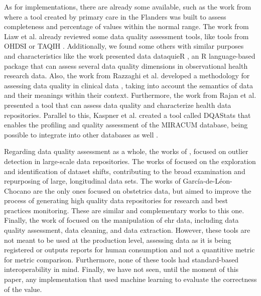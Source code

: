 As for implementations, there are already some available, such as the work from \cite{phanAutomatedDataCleaning2020} where a tool created by primary care in the Flanders was built to assess completeness and percentage of values within the normal range.
The work from Liaw et al. \cite{liawQualityAssessmentRealworld2021} already reviewed some data quality assessment tools, like tools from OHDSI \cite{hripcsakObservationalHealthData2015} or TAQIH \cite{alvarezsanchezTAQIHToolTabular2019}. 
Additionally, we found some others with similar purposes and characteristics like the work presented data dataquieR \cite{schmidtFacilitatingHarmonizedData2021}, an R language-based package that can assess several data quality dimensions in observational health research data. 
Also, the work from Razzaghi et al. developed a methodology for assessing data quality in clinical data \cite{razzaghiDevelopingSystematicApproach2022}, taking into account the semantics of data and their meanings within their context. Furthermore, the work from Rajan et al. \cite{rajanContentAgnosticComputable2019} presented a tool that can assess data quality and characterize health data repositories. Parallel to this, Kaspner et al. created a tool called DQAStats that enables the profiling and quality assessment of the MIRACUM database, being possible to integrate into other databases as well \cite{kapsnerLinkingConsortiumWideData2021a}.

Regarding data quality assessment as a whole, the works of \cite{estiriSemisupervisedEncodingOutlier2019}, focused on outlier detection in large-scale data repositories. The works of \cite{saezEHRtemporalVariabilityDelineatingTemporal2020} focused on the exploration and identification of dataset shifts, contributing to the broad examination and repurposing of large, longitudinal data sets. The works of García-de-Léon-Chocano \cite{saStandardizedDataQuality2017,garcia-de-leon-chocanoConstructionQualityassuredInfant2016,garci;a-de-leon-chocanoConstructionQualityassuredInfant2015} are the only ones focused on obstetrics data, but aimed to improve the process of generating high quality data repositories for research and best practices monitoring. These are similar and complementary works to this one. Finally, the work of \cite{springateREHRPackageManipulating2017} focused on the manipulation of \ac{ehr} data, including data quality assessment, data cleaning, and data extraction. However, these tools are not meant to be used at the production level, assessing data as it is being registered or outputs reports for human consumption and not a quantitive metric for metric comparison. Furthermore, none of these tools had standard-based interoperability in mind. Finally, we have not seen, until the moment of this paper, any implementation that used machine learning to evaluate the correctness of the value.
